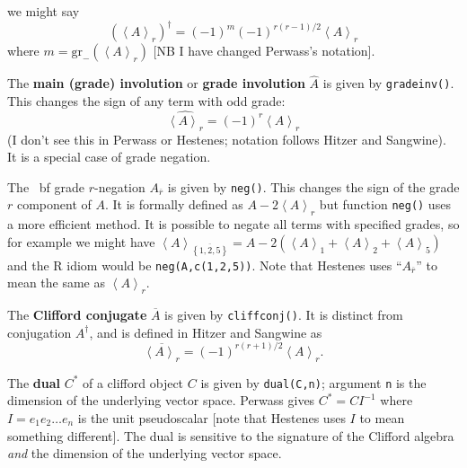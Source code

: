 \documentclass{birkjour}
\theoremstyle{definition}
\theoremstyle{remark}
\numberwithin{equation}{section}
\begin{document}
{{    we might say
    $$
    {\left(\left\langle
    A\right\rangle_r\right)^\dagger=(-1)^m(-1)^{r(r-1)/2}\left\langle
    A\right\rangle_r }
    $$
    where
    ${m=\mathrm{gr}_{-}(\left\langle A\right\rangle_r)}$ [NB
    I have changed Perwass's notation].
    \item The {\bf main (grade) involution} or {\bf grade involution}
    ${\widehat{A}}$ is given by {\tt gradeinv()}.  This
    changes the sign of any term with odd grade:
    $$
    {\widehat{\left\langle A\right\rangle_r} =(-1)^r\left\langle
      A\right\rangle_r}
    $$
    (I don't see this in Perwass or Hestenes; notation follows Hitzer
    and Sangwine).  It is a special case of grade negation.
    \item The {\ bf grade ${r}$-negation} ${A_{\overline{r}}}$ is
      given by {\tt neg()}.  This changes the sign of the grade ${r}$
      component of ${A}$.  It is formally defined as ${A-2\left\langle
        A\right\rangle_r}$ but function {\tt neg()} uses a more
      efficient method.  It is possible to negate all terms with
      specified grades, so for example we might have ${\left\langle
        A\right\rangle_{\overline{\left\lbrace 1,2,5\right\rbrace}} =
        A-2\left( \left\langle A\right\rangle_1 +\left\langle
        A\right\rangle_2+\left\langle A\right\rangle_5\right)}$ and
      the R idiom would be {\tt neg(A,c(1,2,5))}.  Note that Hestenes
      uses ``${A_{\overline{r}}}$'' to mean the same as
      ${\left\langle A\right\rangle_r}$.
    \item The {\bf Clifford conjugate} ${\overline{A}}$ is given by
      {\tt cliffconj()}.  It is distinct from conjugation
      ${A^\dagger}$, and is defined in Hitzer and Sangwine as
    $$
    {\overline{\left\langle A\right\rangle_r} =
      (-1)^{r(r+1)/2}\left\langle A\right\rangle_r.}
    $$
    \item The {\bf dual} ${C^*}$ of a clifford object ${C}$ is given
      by {\tt dual(C,n)}; argument {\tt n} is the dimension of the
      underlying vector space.  Perwass gives ${C^*=CI^{-1}}$ where
      ${I=e_1e_2\ldots e_n}$ is the unit pseudoscalar [note that
        Hestenes uses ${I}$ to mean something different].  The dual is
      sensitive to the signature of the Clifford algebra \emph{and}
      the dimension of the underlying vector space.
      }
}
  
\end{document}
